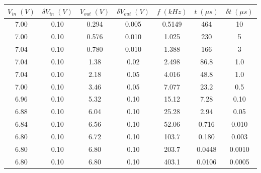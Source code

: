 \begin{tabular}{cc|cc|ccc}
\toprule
$V_{in} \; (V)$ & $\delta V_{in} \; (V)$ & $V_{out} \; (V)$ & $\delta V_{out} \; (V)$ & $f \; (kHz)$ & $t \; (\mu s)$ & $\delta t \; (\mu s)$ \\
\midrule
           7.00 &                   0.10 &            0.294 &                   0.005 &       0.5149 &            464 &                    10 \\
           7.00 &                   0.10 &            0.576 &                   0.010 &        1.025 &            230 &                     5 \\
           7.04 &                   0.10 &            0.780 &                   0.010 &        1.388 &            166 &                     3 \\
           7.04 &                   0.10 &             1.38 &                    0.02 &        2.498 &           86.8 &                   1.0 \\
           7.04 &                   0.10 &             2.18 &                    0.05 &        4.016 &           48.8 &                   1.0 \\
           7.00 &                   0.10 &             3.46 &                    0.05 &        7.077 &           23.2 &                   0.5 \\
           6.96 &                   0.10 &             5.32 &                    0.10 &        15.12 &           7.28 &                  0.10 \\
           6.88 &                   0.10 &             6.04 &                    0.10 &        25.28 &           2.94 &                  0.05 \\
           6.84 &                   0.10 &             6.56 &                    0.10 &        52.06 &          0.716 &                 0.010 \\
           6.80 &                   0.10 &             6.72 &                    0.10 &        103.7 &          0.180 &                 0.003 \\
           6.80 &                   0.10 &             6.80 &                    0.10 &        203.7 &         0.0448 &                0.0010 \\
           6.80 &                   0.10 &             6.80 &                    0.10 &        403.1 &         0.0106 &                0.0005 \\
\bottomrule
\end{tabular}
